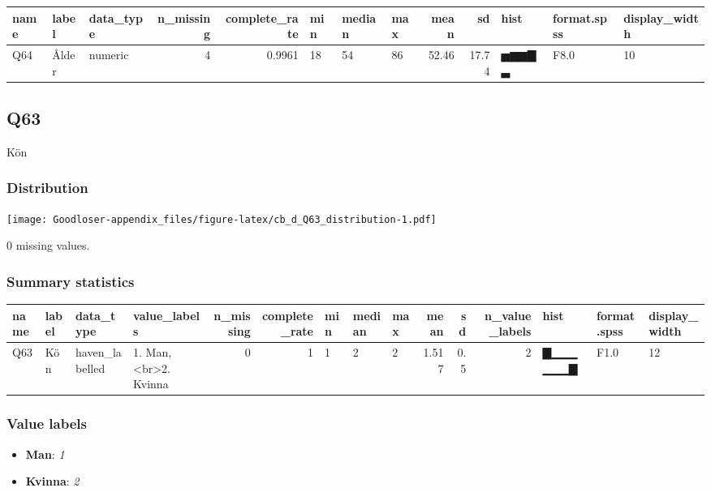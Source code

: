 \documentclass[
]{book}
\providecommand{\tightlist}{%
  \setlength{\itemsep}{0pt}\setlength{\parskip}{0pt}}
\begin{document}
\begin{tabular}{l|l|l|r|r|l|l|l|r|r|l|l|l}
\hline
name & label & data_type & n_missing & complete_rate & min & median & max & mean & sd & hist & format.spss & display_width\\
\hline
Q64 & Ålder & numeric & 4 & 0.9961 & 18 & 54 & 86 & 52.46 & 17.74 & ▅▆▆▇▃ & F8.0 & 10\\
\hline
\end{tabular}

\hypertarget{Q63}{%
\subsection{Q63}\label{Q63}}

Kön

\hypertarget{Q63_distribution}{%
\subsubsection{Distribution}\label{Q63_distribution}}

\texttt{[image: Goodloser-appendix\_files/figure-latex/cb\_d\_Q63\_distribution-1.pdf]}

0 missing values.

\hypertarget{Q63_summary}{%
\subsubsection{Summary statistics}\label{Q63_summary}}

\begin{tabular}{l|l|l|l|r|r|l|l|l|r|r|r|l|l|l}
\hline
name & label & data_type & value_labels & n_missing & complete_rate & min & median & max & mean & sd & n_value_labels & hist & format.spss & display_width\\
\hline
Q63 & Kön & haven_labelled & 1. Man,<br>2. Kvinna & 0 & 1 & 1 & 2 & 2 & 1.517 & 0.5 & 2 & ▇▁▁▁▁▁▁▇ & F1.0 & 12\\
\hline
\end{tabular}

\hypertarget{Q63_labels}{%
\subsubsection{Value labels}\label{Q63_labels}}

\begin{itemize}
\tightlist
\item
  \textbf{Man}: \emph{1}
\item
  \textbf{Kvinna}: \emph{2}
\end{itemize}
\end{document}
